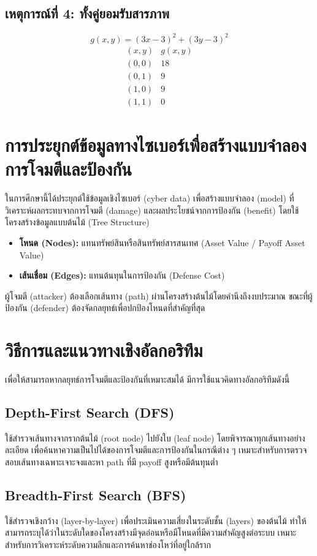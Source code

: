 \subsection{เหตุการณ์ที่ 4: ทั้งคู่ยอมรับสารภาพ}
\[
g(x,y) = (3x-3)^2 + (3y-3)^2
\]
\[
\begin{array}{l|c}
(x,y) & g(x,y) \\ \hline
(0,0) & 18\\
(0,1) & 9\\
(1,0) & 9\\
(1,1) & 0
\end{array}
\]

\section{การประยุกต์ข้อมูลทางไซเบอร์เพื่อสร้างแบบจำลองการโจมตีและป้องกัน}
ในการศึกษานี้ได้ประยุกต์ใช้ข้อมูลเชิงไซเบอร์ (cyber data) เพื่อสร้างแบบจำลอง (model) ที่วิเคราะห์ผลกระทบจากการโจมตี (damage) และผลประโยชน์จากการป้องกัน (benefit) โดยใช้โครงสร้างข้อมูลแบบต้นไม้ (Tree Structure)

\begin{itemize}
  \item \textbf{โหนด (Nodes):} แทนทรัพย์สินหรือสินทรัพย์สารสนเทศ (Asset Value / Payoff Asset Value)
  \item \textbf{เส้นเชื่อม (Edges):} แทนต้นทุนในการป้องกัน (Defense Cost)
\end{itemize}

ผู้โจมตี (attacker) ต้องเลือกเส้นทาง (path) ผ่านโครงสร้างต้นไม้โดยคำนึงถึงงบประมาณ ขณะที่ผู้ป้องกัน (defender) ต้องจัดกลยุทธ์เพื่อปกป้องโหนดที่สำคัญที่สุด
\section{วิธีการและแนวทางเชิงอัลกอริทึม}

เพื่อให้สามารถหากลยุทธ์การโจมตีและป้องกันที่เหมาะสมได้ มีการใช้แนวคิดทางอัลกอริทึมดังนี้

\subsection{Depth-First Search (DFS)}
ใช้สำรวจเส้นทางจากรากต้นไม้ (root node) ไปยังใบ (leaf node) โดยพิจารณาทุกเส้นทางอย่างละเอียด เพื่อค้นหาความเป็นไปได้ของการโจมตีและการป้องกันในกรณีต่าง ๆ เหมาะสำหรับการตรวจสอบเส้นทางเฉพาะเจาะจงและหา path ที่มี payoff สูงหรือมีต้นทุนต่ำ

\subsection{Breadth-First Search (BFS)}
ใช้สำรวจเชิงกว้าง (layer-by-layer) เพื่อประเมินความเสี่ยงในระดับชั้น (layers) ของต้นไม้ ทำให้สามารถระบุได้ว่าในระดับใดของโครงสร้างมีจุดอ่อนหรือมีโหนดที่มีความสำคัญสูงต่อระบบ เหมาะสำหรับการวิเคราะห์ระดับความลึกและการค้นหาช่องโหว่ที่อยู่ใกล้ราก

